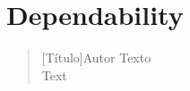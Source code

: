 \chapter{Dependability}
\label{sec:dependability}

\begin{quotation}[Título]{Autor}
Texto \\
Text
\end{quotation}

